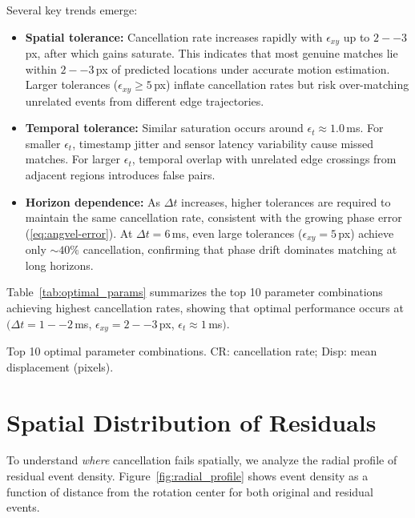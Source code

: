 Several key trends emerge:

\begin{itemize}
\item \textbf{Spatial tolerance:} Cancellation rate increases rapidly with $\epsilon_{xy}$ up to $2--3$\,px, after which gains saturate. This indicates that most genuine matches lie within $2--3$\,px of predicted locations under accurate motion estimation. Larger tolerances ($\epsilon_{xy} \geq 5$\,px) inflate cancellation rates but risk over-matching unrelated events from different edge trajectories.
\item \textbf{Temporal tolerance:} Similar saturation occurs around $\epsilon_t \approx 1.0$\,ms. For smaller $\epsilon_t$, timestamp jitter and sensor latency variability cause missed matches. For larger $\epsilon_t$, temporal overlap with unrelated edge crossings from adjacent regions introduces false pairs.
\item \textbf{Horizon dependence:} As $\Delta t$ increases, higher tolerances are required to maintain the same cancellation rate, consistent with the growing phase error (\eqref{eq:angvel-error}). At $\Delta t=6$\,ms, even large tolerances ($\epsilon_{xy}=5$\,px) achieve only $\sim 40\%$ cancellation, confirming that phase drift dominates matching at long horizons.
\end{itemize}

Table~\ref{tab:optimal_params} summarizes the top 10 parameter combinations achieving highest cancellation rates, showing that optimal performance occurs at $(\Delta t=1--2$\,ms, $\epsilon_{xy}=2--3$\,px, $\epsilon_t \approx 1$\,ms$)$.

\begin{table}[t]
  \centering
  \caption{Top 10 optimal parameter combinations. CR: cancellation rate; Disp: mean displacement (pixels).}
  \label{tab:optimal_params}
  \small
  
\end{table}

\section{Spatial Distribution of Residuals}

To understand \emph{where} cancellation fails spatially, we analyze the radial profile of residual event density. Figure~\ref{fig:radial_profile} shows event density as a function of distance from the rotation center for both original and residual events.

